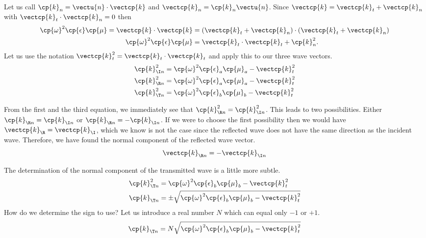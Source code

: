 \begin{refsection}
Let us call $\cp{k}_n=\vectu{n} \cdot \vectcp{k}$ and $\vectcp{k}_n = \cp{k}_n \vectu{n}$.
Since $\vectcp{k} = \vectcp{k}_t + \vectcp{k}_n$ with $\vectcp{k}_t \cdot \vectcp{k}_n=0$ then
\begin{subequations}
    \begin{align}
        \cp{\omega}^2 \cp{\epsilon} \cp{\mu}
        =
        \vectcp{k} \cdot \vectcp{k}
        &=
        \left( \vectcp{k}_t + \vectcp{k}_n \right) \cdot \left( \vectcp{k}_t + \vectcp{k}_n \right)
        \\
        \cp{\omega}^2 \cp{\epsilon} \cp{\mu}
        &=
        \vectcp{k}_t \cdot \vectcp{k}_t + \cp{k}_n^2
        \text{.}
    \end{align}
\end{subequations}
Let us use the notation $\vectcp{k}_t^2 = \vectcp{k}_t \cdot \vectcp{k}_t$ and apply this to our three wave vectors.
\begin{align}
    \cp{k}_{\I n}^2 &= \cp{\omega}^2 \cp{\epsilon}_a \cp{\mu}_a - \vectcp{k}_t^2 \\
    \cp{k}_{\R n}^2 &= \cp{\omega}^2 \cp{\epsilon}_a \cp{\mu}_a - \vectcp{k}_t^2 \\
    \cp{k}_{\T n}^2 &= \cp{\omega}^2 \cp{\epsilon}_b \cp{\mu}_b - \vectcp{k}_t^2
\end{align}

From the first and the third equation, we immediately see that
$\cp{k}_{\R n}^2 = \cp{k}_{\I n}^2$.
This leads to two possibilities.
Either $\cp{k}_{\R n} = \cp{k}_{\I n}$ or $\cp{k}_{\R n} = -\cp{k}_{\I n}$.
If we were to choose the first possibility then we would have $\vectcp{k}_\R = \vectcp{k}_\I$, which we know is not the case since the reflected wave does not have the same direction as the incident wave.
Therefore, we have found the normal component of the reflected wave vector.
\begin{equation}
    \vectcp{k}_{\R n} = -\vectcp{k}_{\I n}
\end{equation}

The determination of the normal component of the transmitted wave is a little more subtle.
\begin{subequations}
    \label{eq:wavevector_reflected}
    \begin{align}
        \cp{k}_{\T n}^2
        &=
        \cp{\omega}^2 \cp{\epsilon}_b \cp{\mu}_b - \vectcp{k}_t^2
        \\
        \cp{k}_{\T n}
        &=
        \pm
        \sqrt{
            \cp{\omega}^2 \cp{\epsilon}_b \cp{\mu}_b - \vectcp{k}_t^2
        }
    \end{align}
\end{subequations}
How do we determine the sign to use?
Let us introduce a real number $N$ which can equal only $-1$ or $+1$.
\begin{equation}
    \cp{k}_{\T n} = N \sqrt{\cp{\omega}^2 \cp{\epsilon}_b \cp{\mu}_b - \vectcp{k}_t^2}
\end{equation}


\end{refsection}
